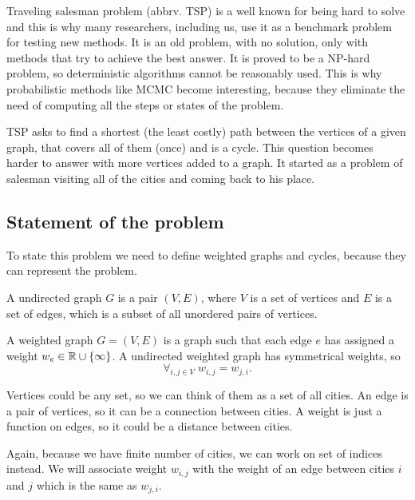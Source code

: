 Traveling salesman problem (abbrv. TSP) is a well known for being hard to solve and this is why many researchers, including us, use it as a benchmark problem for testing new methods. It is an old problem, with no solution, only with methods that try to achieve the best answer. It is proved to be a NP-hard problem, so deterministic algorithms cannot be reasonably used. This is why probabilistic methods like MCMC become interesting, because they eliminate the need of computing all the steps or states of the problem.

TSP asks to find a shortest (the least costly) path between the vertices of a given graph, that covers all of them (once) and is a cycle. This question becomes harder to answer with more vertices added to a graph. It started as a problem of salesman visiting all of the cities and coming back to his place.

\subsection{Statement of the problem}
	To state this problem we need to define weighted graphs and cycles, because they can represent the problem. 
	
	\begin{definition}
		A undirected graph $G$ is a pair $(V, E)$, where $V$ is a set of vertices and $E$ is a set of edges, which is a subset of all unordered pairs of vertices.
	\end{definition}
	\begin{definition}
		A weighted graph $G = (V, E)$ is a graph such that each edge $e$ has assigned a weight $w_e \in \mathbb{R} \cup \left\{ \infty \right\}$. A undirected weighted graph has symmetrical weights, so
		\begin{equation*}
			\forall_{i,j \in V} \; w_{i,j} = w_{j,i}.
		\end{equation*}
	\end{definition}
	Vertices could be any set, so we can think of them as a set of all cities. An edge is a pair of vertices, so it can be a connection between cities. A weight is just a function on edges, so it could be a distance between cities. 
	
	Again, because we have finite number of cities, we can work on set of indices instead. We will associate weight $w_{i,j}$ with the weight of an edge between cities $i$ and $j$ which is the same as $w_{j,i}$.
	
